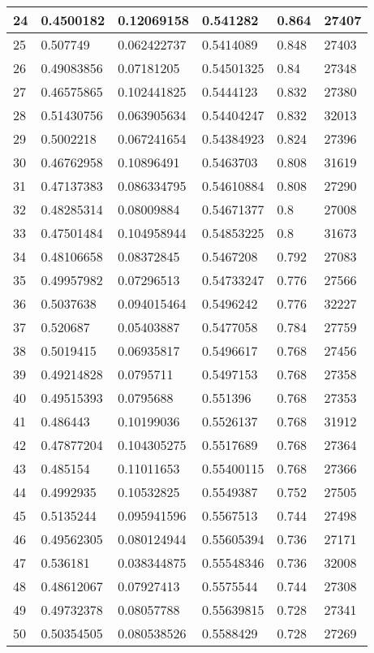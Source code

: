 \begin{longtable}{|l|l|l|l|l|l|}
24 & 0.4500182 & 0.12069158 & 0.541282 & 0.864 & 27407 \\ \hline 
25 & 0.507749 & 0.062422737 & 0.5414089 & 0.848 & 27403 \\ \hline 
26 & 0.49083856 & 0.07181205 & 0.54501325 & 0.84 & 27348 \\ \hline 
27 & 0.46575865 & 0.102441825 & 0.5444123 & 0.832 & 27380 \\ \hline 
28 & 0.51430756 & 0.063905634 & 0.54404247 & 0.832 & 32013 \\ \hline 
29 & 0.5002218 & 0.067241654 & 0.54384923 & 0.824 & 27396 \\ \hline 
30 & 0.46762958 & 0.10896491 & 0.5463703 & 0.808 & 31619 \\ \hline 
31 & 0.47137383 & 0.086334795 & 0.54610884 & 0.808 & 27290 \\ \hline 
32 & 0.48285314 & 0.08009884 & 0.54671377 & 0.8 & 27008 \\ \hline 
33 & 0.47501484 & 0.104958944 & 0.54853225 & 0.8 & 31673 \\ \hline 
34 & 0.48106658 & 0.08372845 & 0.5467208 & 0.792 & 27083 \\ \hline 
35 & 0.49957982 & 0.07296513 & 0.54733247 & 0.776 & 27566 \\ \hline 
36 & 0.5037638 & 0.094015464 & 0.5496242 & 0.776 & 32227 \\ \hline 
37 & 0.520687 & 0.05403887 & 0.5477058 & 0.784 & 27759 \\ \hline 
38 & 0.5019415 & 0.06935817 & 0.5496617 & 0.768 & 27456 \\ \hline 
39 & 0.49214828 & 0.0795711 & 0.5497153 & 0.768 & 27358 \\ \hline 
40 & 0.49515393 & 0.0795688 & 0.551396 & 0.768 & 27353 \\ \hline 
41 & 0.486443 & 0.10199036 & 0.5526137 & 0.768 & 31912 \\ \hline 
42 & 0.47877204 & 0.104305275 & 0.5517689 & 0.768 & 27364 \\ \hline 
43 & 0.485154 & 0.11011653 & 0.55400115 & 0.768 & 27366 \\ \hline 
44 & 0.4992935 & 0.10532825 & 0.5549387 & 0.752 & 27505 \\ \hline 
45 & 0.5135244 & 0.095941596 & 0.5567513 & 0.744 & 27498 \\ \hline 
46 & 0.49562305 & 0.080124944 & 0.55605394 & 0.736 & 27171 \\ \hline 
47 & 0.536181 & 0.038344875 & 0.55548346 & 0.736 & 32008 \\ \hline 
48 & 0.48612067 & 0.07927413 & 0.5575544 & 0.744 & 27308 \\ \hline 
49 & 0.49732378 & 0.08057788 & 0.55639815 & 0.728 & 27341 \\ \hline 
50 & 0.50354505 & 0.080538526 & 0.5588429 & 0.728 & 27269 \\ \hline 
\end{longtable}